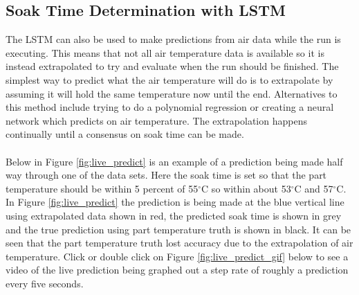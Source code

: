 \subsection{Soak Time Determination with LSTM}
The LSTM can also be used to make predictions from air data while the run is executing. This means that not all air temperature data is available so it is instead extrapolated to try and evaluate when the run should be finished. The simplest way to predict what the air temperature will do is to extrapolate by assuming it will hold the same temperature now until the end. Alternatives to this method include trying to do a polynomial regression or creating a neural network which predicts on air temperature. The extrapolation happens continually until a consensus on soak time can be made. \\\\
Below in Figure \ref{fig:live_predict} is an example of a prediction being made half way through one of the data sets. Here the soak time is set so that the part temperature should be within 5 percent of 55$^\circ$C so within about 53$^\circ$C and 57$^\circ$C. In Figure \ref{fig:live_predict} the prediction is being made at the blue vertical line using extrapolated data shown in red, the predicted soak time is shown in grey and the true prediction using part temperature truth is shown in black. It can be seen that the part temperature truth lost accuracy due to the extrapolation of air temperature. Click or double click on Figure \ref{fig:live_predict_gif} below to see a video of the live prediction being graphed out a step rate of roughly a prediction every five seconds.
